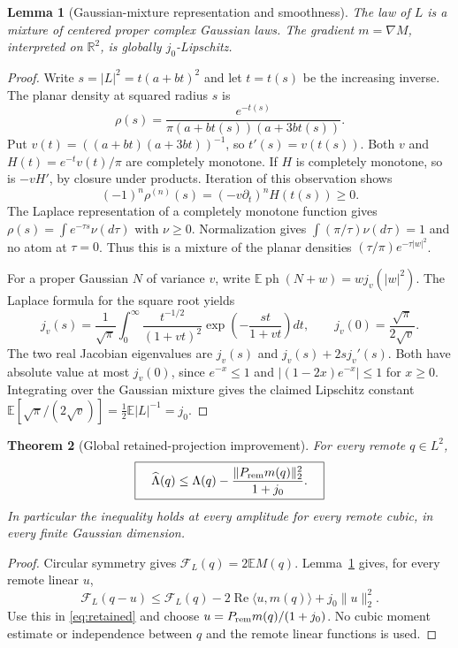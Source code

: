 \documentclass[11pt]{article}
\newtheorem{theorem}{Theorem}
\newtheorem{lemma}[theorem]{Lemma}
\newcommand{\E}{\mathbb E}
\newcommand{\R}{\mathbb R}
\newcommand{\ph}{\operatorname{ph}}
\newcommand{\Rea}{\operatorname{Re}}
\begin{document}
\begin{lemma}[Gaussian-mixture representation and smoothness]\label{lem:smooth}
The law of $L$ is a mixture of centered proper complex Gaussian laws.
The gradient $m=\nabla M$, interpreted on $\R^2$, is globally $j_0$-Lipschitz.
\end{lemma}
\begin{proof}
Write $s=|L|^2=t(a+bt)^2$ and let $t=t(s)$ be the increasing inverse.
The planar density at squared radius $s$ is
\[
 \rho(s)=\frac{e^{-t(s)}}{\pi(a+bt(s))(a+3bt(s))}.
\]
Put $v(t)=((a+bt)(a+3bt))^{-1}$, so $t'(s)=v(t(s))$.
Both $v$ and $H(t)=e^{-t}v(t)/\pi$ are completely monotone.
If $H$ is completely monotone, so is $-vH'$, by closure under products.
Iteration of this observation shows
\[
 (-1)^n\rho^{(n)}(s)=(-v\partial_t)^nH(t(s))\ge0.
\]
The Laplace representation of a completely monotone function gives
$\rho(s)=\int e^{-\tau s}\nu(d\tau)$ with $\nu\ge0$.
Normalization gives $\int(\pi/\tau)\nu(d\tau)=1$ and no atom at $\tau=0$.
Thus this is a mixture of the planar densities
$(\tau/\pi)e^{-\tau|w|^2}$.

For a proper Gaussian $N$ of variance $v$, write
$\E\ph(N+w)=w j_v(|w|^2)$. The Laplace formula for the square root yields
\[
 j_v(s)=\frac1{\sqrt\pi}\int_0^\infty
 \frac{t^{-1/2}}{(1+vt)^2}
 \exp\left(-\frac{st}{1+vt}\right)dt,
 \qquad j_v(0)=\frac{\sqrt\pi}{2\sqrt v}.
\]
The two real Jacobian eigenvalues are $j_v(s)$ and
$j_v(s)+2s j_v'(s)$. Both have absolute value at most $j_v(0)$, since
$e^{-x}\le1$ and $|(1-2x)e^{-x}|\le1$ for $x\ge0$.
Integrating over the Gaussian mixture gives the claimed Lipschitz constant
$\E[\sqrt\pi/(2\sqrt v)]=\frac12\E|L|^{-1}=j_0$.
\end{proof}

\begin{theorem}[Global retained-projection improvement]\label{thm:remote}
For every remote $q\in L^2$,
\begin{equation}\label{eq:globalgain}
 \boxed{\quad
 \widehat\Lambda(q)\le\Lambda(q)
 -\frac{\|P_{\rm rem}m(q)\|_2^2}{1+j_0}.
 \quad}
\end{equation}
In particular the inequality holds at every amplitude for every remote cubic,
in every finite Gaussian dimension.
\end{theorem}
\begin{proof}
Circular symmetry gives $\mathcal F_L(q)=2\E M(q)$.
Lemma~\ref{lem:smooth} gives, for every remote linear $u$,
\[
 \mathcal F_L(q-u)\le\mathcal F_L(q)
 -2\Rea\langle u,m(q)\rangle+j_0\|u\|_2^2.
\]
Use this in \eqref{eq:retained} and choose
$u=P_{\rm rem}m(q)/(1+j_0)$. No cubic moment estimate or independence between
$q$ and the remote linear functions is used.
\end{proof}
\end{document}
